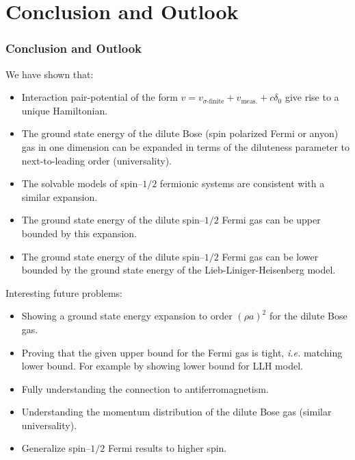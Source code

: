 \documentclass{beamer}[10]
\newcommand{\ie}{\emph{i.e.} }
\begin{document}
\section{Conclusion and Outlook}
\begin{frame}
	\frametitle{Conclusion and Outlook}
	\small
	\begin{block}{We have shown that:}
		\small
		\begin{itemize}
			\item Interaction pair-potential of the form $v=v_{\sigma\text{-finite}}+v_{\text{meas.}}+c\delta_0$ give rise to a unique Hamiltonian.
			\item The ground state energy of the dilute Bose (spin polarized Fermi or anyon) gas in one dimension can be expanded in terms of the diluteness parameter to next-to-leading order (universality).
			\item The solvable models of spin--$1/2$ fermionic systems are consistent with a similar expansion.
			\item The ground state energy of the dilute spin--$1/2$ Fermi gas can be upper bounded by this expansion.
			\item The ground state energy of the dilute spin--$1/2$ Fermi gas can be lower bounded by the ground state energy of the Lieb-Liniger-Heisenberg model.
		\end{itemize}
	\end{block}
	
\end{frame}
\begin{frame}
	\begin{block}{Interesting future problems:}
		\begin{itemize}
			\item Showing a ground state energy expansion to order $(\rho a)^2$ for the dilute Bose gas.
			\item  Proving that the given upper bound for the Fermi gas is tight, \ie matching lower bound. For example by showing lower bound for LLH model.
			\item Fully understanding the connection to antiferromagnetism.
			\item Understanding the momentum distribution of the dilute Bose gas (similar universality).
			\item Generalize spin--$1/2$ Fermi results to higher spin.
		\end{itemize}
	\end{block}
\end{frame}

\begin{frame}
\end{frame}
\end{document}
